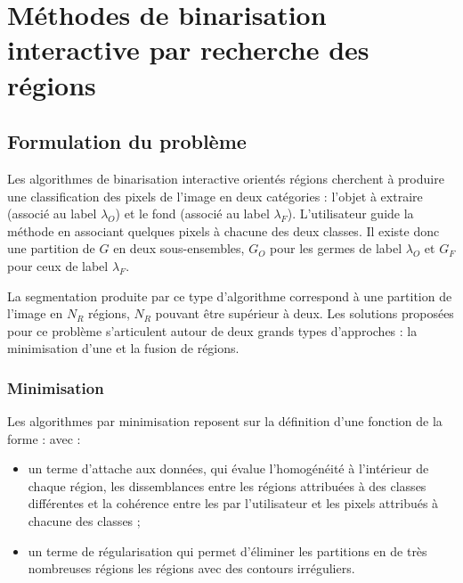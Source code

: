\section{Méthodes de binarisation interactive par recherche des régions}

\subsection{Formulation du problème}
Les algorithmes de binarisation interactive orientés régions cherchent à produire une classification des pixels de l'image en deux catégories : l'objet à extraire (associé au label $\lambda_{O}$) et le fond (associé au label $\lambda_{F}$).  L'utilisateur guide la méthode en associant quelques pixels à chacune des deux classes. Il existe donc une partition de $G$ en deux sous-ensembles, $G_{O}$ pour les germes de label $\lambda_{O}$ et $G_{F}$ pour ceux de label $\lambda_{F}$. 

La segmentation produite par ce type d'algorithme correspond à une partition de l'image en $N_{R}$ régions, $N_{R}$ pouvant être supérieur à deux. Les solutions proposées pour ce problème s'articulent autour de deux grands types d'approches : la minimisation d'une  et la fusion de régions. 

\subsubsection{Minimisation }
Les algorithmes par minimisation  reposent sur la définition d'une  fonction  de la forme : 
avec :
\begin{itemize}
\item {} un terme d'attache aux données, qui évalue l'homogénéité à l'intérieur de chaque région, les dissemblances entre les régions attribuées à des classes différentes et la cohérence entre les  par l'utilisateur et les pixels attribués à chacune des classes ;
\item {} un terme de régularisation qui permet d'éliminer les partitions en de très nombreuses régions  les régions avec des contours irréguliers. 
\end{itemize}

